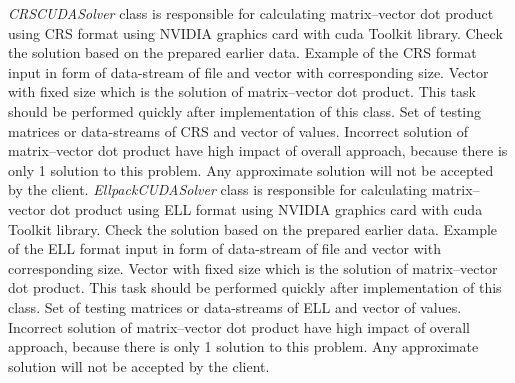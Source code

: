 	\clearpage
	{
		{
			\emph{CRSCUDASolver} class is responsible for calculating matrix--vector dot product using \gls{CRS} format using NVIDIA graphics card with \gls{cuda} Toolkit library.
		}
		{
			Check the solution based on the prepared earlier data.
		}
		{
			Example of the \gls{CRS} format input in form of data-stream of file and vector with corresponding size.
		}
		{
			Vector with fixed size which is the solution of matrix--vector dot product.
		}
		{
			This task should be performed quickly after implementation of this class.
		}
		{
			Set of testing matrices or data-streams of \gls{CRS} and vector of values.
		}
		{
			Incorrect solution of matrix--vector dot product have high impact of overall approach, because there is only 1 solution to this problem. Any approximate solution will not be accepted by the client.
		}
	}
	{
		{
			\emph{EllpackCUDASolver} class is responsible for calculating matrix--vector dot product using \gls{ELL} format using NVIDIA graphics card with \gls{cuda} Toolkit library.
		}
		{
			Check the solution based on the prepared earlier data.
		}
		{
			Example of the \gls{ELL} format input in form of data-stream of file and vector with corresponding size.
		}
		{
			Vector with fixed size which is the solution of matrix--vector dot product.
		}
		{
			This task should be performed quickly after implementation of this class.
		}
		{
			Set of testing matrices or data-streams of \gls{ELL} and vector of values.
		}
		{
			Incorrect solution of matrix--vector dot product have high impact of overall approach, because there is only 1 solution to this problem. Any approximate solution will not be accepted by the client.
		}
	}